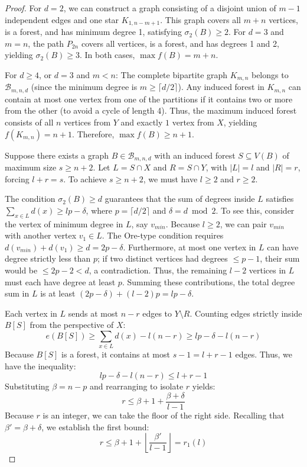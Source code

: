 \documentclass[10pt,a4paper]{amsart}
\begin{document}
\begin{proof}
For $d=2$, we can construct a graph consisting of a disjoint union of $m-1$ independent edges and one star $K_{1, n-m+1}$.
This graph covers all $m+n$ vertices, is a forest, and has minimum degree 1, satisfying $\sigma_2(B) \ge 2$.
For $d=3$ and $m=n$, the path $P_{2n}$ covers all vertices, is a forest, and has degrees 1 and 2, yielding $\sigma_2(B) \ge 3$.
In both cases, $\max f(B) = m+n$.

For $d \ge 4$, or $d=3$ and $m < n$: The complete bipartite graph $K_{m,n}$ belongs to $\mathcal{B}_{m,n,d}$ (since the minimum degree is $m \ge \lceil d/2 \rceil$). Any induced forest in $K_{m,n}$ can contain at most one vertex from one of the partitions if it contains two or more from the other (to avoid a cycle of length 4). Thus, the maximum induced forest consists of all $n$ vertices from $Y$ and exactly $1$ vertex from $X$, yielding $f(K_{m,n}) = n+1$. Therefore, $\max f(B) \ge n+1$.

Suppose there exists a graph $B \in \mathcal{B}_{m,n,d}$ with an induced forest $S \subseteq V(B)$ of maximum size $s \ge n+2$.
Let $L = S \cap X$ and $R = S \cap Y$, with $|L| = l$ and $|R| = r$, forcing $l+r = s$.
To achieve $s \ge n+2$, we must have $l \ge 2$ and $r \ge 2$.

The condition $\sigma_2(B) \ge d$ guarantees that the sum of degrees inside $L$ satisfies $\sum_{x \in L} d(x) \ge lp - \delta$, where $p = \lceil d/2 \rceil$ and $\delta = d \bmod 2$.
To see this, consider the vertex of minimum degree in $L$, say $v_{min}$. Because $l \ge 2$, we can pair $v_{min}$ with another vertex $v_1 \in L$. The Ore-type condition requires $d(v_{min}) + d(v_1) \ge d = 2p - \delta$. Furthermore, at most one vertex in $L$ can have degree strictly less than $p$; if two distinct vertices had degrees $\le p-1$, their sum would be $\le 2p-2 < d$, a contradiction. Thus, the remaining $l-2$ vertices in $L$ must each have degree at least $p$. Summing these contributions, the total degree sum in $L$ is at least $(2p - \delta) + (l-2)p = lp - \delta$.

Each vertex in $L$ sends at most $n-r$ edges to $Y \setminus R$.
Counting edges strictly inside $B[S]$ from the perspective of $X$:
\[ e(B[S]) \ge \sum_{x \in L} d(x) - l(n-r) \ge lp - \delta - l(n-r) \]
Because $B[S]$ is a forest, it contains at most $s-1 = l+r-1$ edges.
Thus, we have the inequality:
\[ lp - \delta - l(n-r) \le l+r-1 \]
Substituting $\beta = n-p$ and rearranging to isolate $r$ yields:
\[ r \le \beta + 1 + \frac{\beta + \delta}{l-1} \]
Because $r$ is an integer, we can take the floor of the right side. Recalling that $\beta' = \beta + \delta$, we establish the first bound:
\[ r \le \beta + 1 + \left\lfloor \frac{\beta'}{l-1} \right\rfloor = r_1(l) \]


\end{proof}
\end{document}
